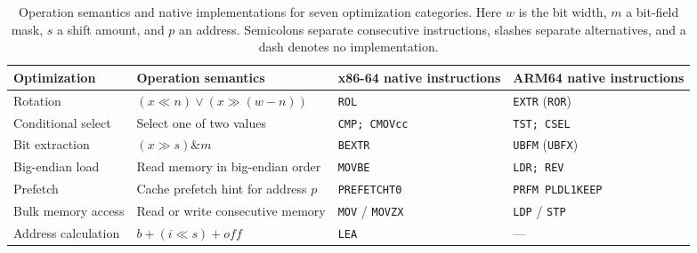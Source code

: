 \begin{table}[t]
\centering
\small
\caption{Operation semantics and native implementations for seven optimization categories. Here $w$ is the bit width, $m$ a bit-field mask, $s$ a shift amount, and $p$ an address. Semicolons separate consecutive instructions, slashes separate alternatives, and a dash denotes no implementation.}
\label{tab:descriptors}
\setlength{\tabcolsep}{5pt}
\renewcommand{\arraystretch}{1.12}
\begin{tabular*}{\textwidth}{@{\extracolsep{\fill}}llll@{}}
\toprule
\textbf{Optimization} & \textbf{Operation semantics} & \textbf{x86-64 native instructions} & \textbf{ARM64 native instructions} \\
\midrule
Rotation & $(x\ll n)\lor(x\gg(w-n))$ & \texttt{ROL} & \texttt{EXTR} (\texttt{ROR}) \\
Conditional select & Select one of two values & \texttt{CMP; CMOVcc} & \texttt{TST; CSEL} \\
Bit extraction & $(x\gg s)\mathbin{\&}m$ & \texttt{BEXTR} & \texttt{UBFM} (\texttt{UBFX}) \\
Big-endian load & Read memory in big-endian order & \texttt{MOVBE} & \texttt{LDR; REV} \\
Prefetch & Cache prefetch hint for address $p$ & \texttt{PREFETCHT0} & \texttt{PRFM PLDL1KEEP} \\
Bulk memory access & Read or write consecutive memory & \texttt{MOV} / \texttt{MOVZX} & \texttt{LDP} / \texttt{STP} \\
Address calculation & $b+(i\ll s)+off$ & \texttt{LEA} & --- \\
\bottomrule
\end{tabular*}
\end{table}
